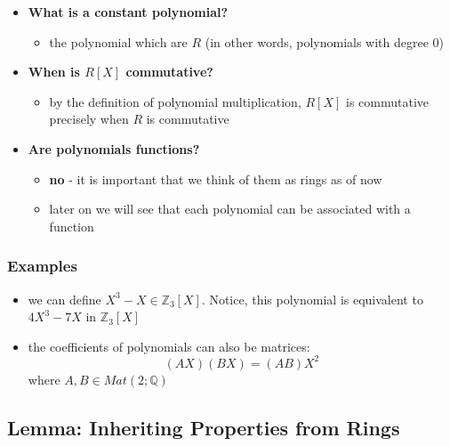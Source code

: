\documentclass{exam}
\begin{document}
\begin{itemize}
\begin{itemize}
    \end{itemize}
    \item \textbf{What is a constant polynomial?}
    \begin{itemize}
        \item the polynomial which are $R$ (in other words, polynomials with degree 0)
    \end{itemize}
    \item \textbf{When is $R[X]$ commutative?}
    \begin{itemize}
        \item by the definition of polynomial multiplication, $R[X]$ is commutative precisely when $R$ is commutative
    \end{itemize}
    \item \textbf{Are polynomials functions?}
    \begin{itemize}
        \item \textbf{no} - it is important that we think of them as rings as of now
        \item later on we will see that each polynomial can be associated with a function
    \end{itemize}
\end{itemize}

\subsubsection{Examples}

\begin{itemize}
    \item we can define $X^3 - X \in \mathbb{Z}_3[X]$. Notice, this polynomial is equivalent to $4X^3 - 7X$ in $\mathbb{Z}_3[X]$
    \item the coefficients of polynomials can also be matrices:
    \[
    (AX)(BX) = (AB)X^2
    \]
    where $A,B \in Mat(2;\mathbb{Q})$
\end{itemize}

\subsection{Lemma: Inheriting Properties from Rings}

\end{document}
